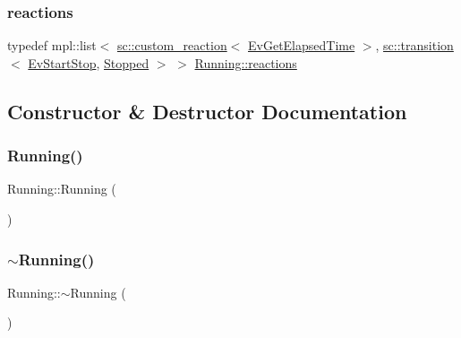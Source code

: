 \mbox{\label{struct_running_a5966603a0d610f1db7878871d96d7737}} 
\subsubsection{\texorpdfstring{reactions}{reactions}\hspace{0.1cm}{\footnotesize\ttfamily [3/3]}}
{\footnotesize\ttfamily typedef mpl\+::list$<$ \mbox{\hyperlink{classboost_1_1statechart_1_1custom__reaction}{sc\+::custom\+\_\+reaction}}$<$ \mbox{\hyperlink{struct_ev_get_elapsed_time}{Ev\+Get\+Elapsed\+Time}} $>$, \mbox{\hyperlink{classboost_1_1statechart_1_1transition}{sc\+::transition}}$<$ \mbox{\hyperlink{struct_ev_start_stop}{Ev\+Start\+Stop}}, \mbox{\hyperlink{struct_stopped}{Stopped}} $>$ $>$ \mbox{\hyperlink{struct_running_a9c7d824351006514acf617bd07f2d222}{Running\+::reactions}}}



\subsection{Constructor \& Destructor Documentation}
\mbox{\label{struct_running_a4f9dd4f9c1b1ce72f2b65b13d9b4e65a}} 
\subsubsection{\texorpdfstring{Running()}{Running()}\hspace{0.1cm}{\footnotesize\ttfamily [1/2]}}
{\footnotesize\ttfamily Running\+::\+Running (\begin{DoxyParamCaption}{ }\end{DoxyParamCaption})\hspace{0.3cm}{\ttfamily [inline]}}

\mbox{\label{struct_running_a642965fca4984b52e6a65696380035ac}} 
\subsubsection{\texorpdfstring{$\sim$\+Running()}{~Running()}\hspace{0.1cm}{\footnotesize\ttfamily [1/2]}}
{\footnotesize\ttfamily Running\+::$\sim$\+Running (\begin{DoxyParamCaption}{ }\end{DoxyParamCaption})\hspace{0.3cm}{\ttfamily [inline]}}


